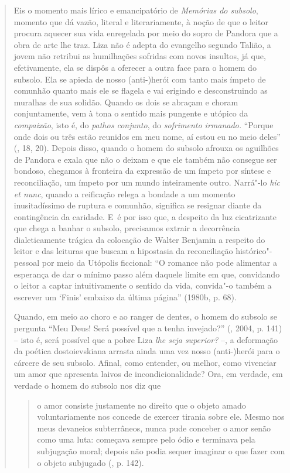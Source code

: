 {\begin{quote}
Eis o momento mais lírico e emancipatório de \emph{Memórias do subsolo},
momento que dá vazão, literal e literariamente, à noção de que o leitor
procura aquecer sua vida enregelada por meio do sopro de Pandora que a
obra de arte lhe traz. Liza não é adepta do evangelho segundo Talião, a
jovem não retribui as humilhações sofridas com novos insultos, já que,
efetivamente, ela se dispôs a oferecer a outra face para o homem do
subsolo. Ela se apieda de nosso (anti-)herói com tanto mais ímpeto de
comunhão quanto mais ele se flagela e vai erigindo e desconstruindo as
muralhas de sua solidão. Quando os dois se abraçam e choram
conjuntamente, vem à tona o sentido mais pungente e utópico da
\emph{compaixão}, isto é, do \emph{pathos conjunto}, do \emph{sofrimento
irmanado.} ``Porque onde dois ou três estão reunidos em meu nome, aí
estou eu no meio deles'' (, 18, 20). Depois disso, quando o homem
do subsolo afrouxa os aguilhões de Pandora e exala que não o deixam e
que ele também não consegue ser bondoso, chegamos à fronteira da
expressão de um ímpeto por síntese e reconciliação, um ímpeto por um
mundo inteiramente outro. Narrá"-lo \emph{hic et nunc}, quando a
reificação relega a bondade a um momento inusitadíssimo de ruptura e
comunhão, significa se resignar diante da contingência da caridade. E~é
por isso que, a despeito da luz cicatrizante que chega a banhar o
subsolo, precisamos extrair a decorrência dialeticamente trágica da
colocação de Walter Benjamin a respeito do leitor e das leituras que
buscam a hipostasia da reconciliação histórico"-pessoal por meio da
Utópolis ficcional: ``O romance não pode alimentar a esperança de dar o
mínimo passo além daquele limite em que, convidando o leitor a captar
intuitivamente o sentido da vida, convida"-o também a escrever um `Finis'
embaixo da última página'' (1980b, p. 68).

Quando, em meio ao choro e ao ranger de dentes, o homem do subsolo se
pergunta ``Meu Deus! Será possível que a tenha invejado?'' (,
2004, p. 141) -- isto é, será possível que a pobre Liza \emph{lhe seja
superior?} --, a deformação da poética dostoievskiana arrasta ainda uma
vez nosso (anti-)herói para o cárcere de seu subsolo. Afinal, como
entender, ou melhor, como vivenciar um amor que apresenta laivos de
incondicionalidade? Ora, em verdade, em verdade o homem do subsolo nos
diz que

\begin{quote}
o amor consiste justamente no direito que o objeto amado voluntariamente
nos concede de exercer tirania sobre ele. Mesmo nos meus devaneios
subterrâneos, nunca pude conceber o amor senão como uma luta: começava
sempre pelo ódio e terminava pela subjugação moral; depois não podia
sequer imaginar o que fazer com o objeto subjugado (, p. 142).
\end{quote}


\end{quote}}
